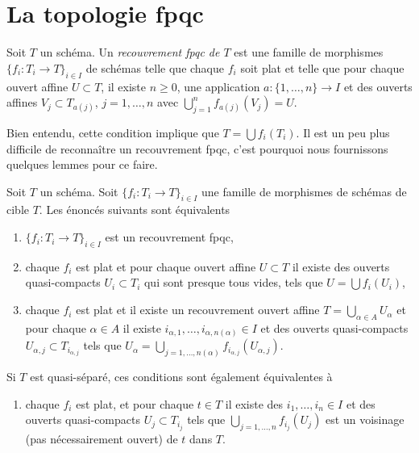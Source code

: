 \section{La topologie fpqc}
\label{section-fpqc}

\begin{definition}
\label{definition-fpqc-covering}
Soit $T$ un schéma. Un {\it recouvrement fpqc de $T$} est une famille de morphismes $\{f_i : T_i \to T\}_{i \in I}$ de schémas telle que chaque $f_i$ soit plat et telle que pour chaque ouvert affine $U \subset T$, il existe $n \geq 0$, une application $a : \{1, \ldots, n\} \to I$ et des ouverts affines $V_j \subset T_{a(j)}$, $j = 1, \ldots, n$ avec $\bigcup_{j = 1}^n f_{a(j)}(V_j) = U$.
\end{definition}

\noindent
Bien entendu, cette condition implique que $T = \bigcup f_i(T_i)$. Il est un peu plus difficile de reconnaître un recouvrement fpqc, c'est pourquoi nous fournissons quelques lemmes pour ce faire.

\begin{lemma}
\label{lemma-recognize-fpqc-covering}
Soit $T$ un schéma. Soit $\{f_i : T_i \to T\}_{i \in I}$ une famille de morphismes de schémas de cible $T$. Les énoncés suivants sont équivalents
\begin{enumerate}
\item $\{f_i : T_i \to T\}_{i \in I}$ est un recouvrement fpqc,
\item chaque $f_i$ est plat et pour chaque ouvert affine $U \subset T$ il existe des ouverts quasi-compacts $U_i \subset T_i$ qui sont presque tous vides, tels que $U = \bigcup f_i(U_i)$,
\item chaque $f_i$ est plat et il existe un recouvrement ouvert affine $T = \bigcup_{\alpha \in A} U_\alpha$ et pour chaque $\alpha \in A$ il existe $i_{\alpha, 1}, \ldots, i_{\alpha, n(\alpha)} \in I$ et des ouverts quasi-compacts $U_{\alpha, j} \subset T_{i_{\alpha, j}}$ tels que $U_\alpha = \bigcup_{j = 1, \ldots, n(\alpha)} f_{i_{\alpha, j}}(U_{\alpha, j})$.
\end{enumerate}
Si $T$ est quasi-séparé, ces conditions sont également équivalentes à
\begin{enumerate}
\item[(4)] chaque $f_i$ est plat, et pour chaque $t \in T$ il existe des $i_1, \ldots, i_n \in I$ et des ouverts quasi-compacts $U_j \subset T_{i_j}$ tels que $\bigcup_{j = 1, \ldots, n} f_{i_j}(U_j)$ est un voisinage (pas nécessairement ouvert) de $t$ dans $T$.
\end{enumerate}
\end{lemma}

